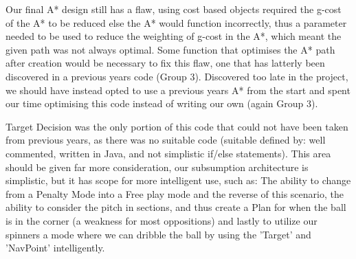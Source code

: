 Our final A* design still has a flaw, using cost based objects required the 
g-cost of the A* to be reduced else the A* would function incorrectly, thus a 
parameter needed to be used to reduce the weighting of g-cost in the A*, which 
meant the given path was not always optimal. Some function that optimises the A* 
path after creation would be necessary to fix this flaw, one that has latterly 
been discovered in a previous years code (Group 3). Discovered too late 
in the project, we should have instead opted to use a previous years A* from the 
start and spent our time optimising this code instead of writing our own 
(again Group 3).

Target Decision was the only portion of this code that could not have been 
taken from previous years, as there was no suitable code (suitable defined by:
well commented, written in Java, and not simplistic if/else statements). This 
area should be given far more consideration, our subsumption architecture is
simplistic, but it has scope for more intelligent use, such as: The ability to
change from a Penalty Mode into a Free play mode and the reverse of this 
scenario, the ability to consider the pitch in sections, and thus create a Plan
for when the ball is in the corner (a weakness for most oppositions) and lastly 
to utilize our spinners a mode where we can dribble the ball by using the 
'Target' and 'NavPoint' intelligently.


